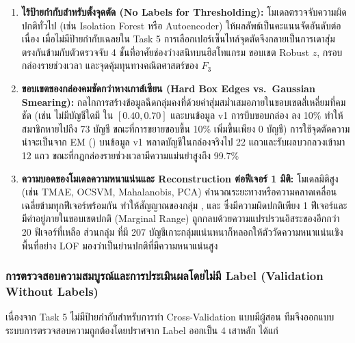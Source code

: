 \begin{decisionbox}
\begin{enumerate}
  \item \textbf{ไร้ป้ายกำกับสำหรับตั้งจุดตัด (No Labels for Thresholding):} โมเดลตรวจจับความผิดปกติทั่วไป (เช่น Isolation Forest หรือ Autoencoder) ให้ผลลัพธ์เป็นคะแนนจัดอันดับต่อเนื่อง เมื่อไม่มีป้ายกำกับเฉลยใน Task 5 การเลือกเปอร์เซ็นไทล์จุดตัดจึงกลายเป็นการเดาสุ่ม ตรงกันข้ามกับตัวตรวจจับ 4 ชั้นที่อาศัยช่องว่างสนิทบนฮิสโทแกรม ขอบเขต Robust $z$, กรอบกล่องรายช่วงเวลา และจุดคุ้มทุนทางคณิตศาสตร์ของ $F_3$
  \item \textbf{ขอบเขตของกล่องคมชัดกว่าหางเกาส์เซียน (Hard Box Edges vs.\ Gaussian Smearing):} กลไกการสร้างข้อมูลฉีดกลุ่มคงที่ด้วยค่าสุ่มสม่ำเสมอภายในขอบเขตสี่เหลี่ยมที่คมชัด (เช่น ไม่มีบัญชีใดมี  ใน $[0.40, 0.70]$ และบนข้อมูล v1 การบีบขอบกล่อง  ลง 10\% ทำให้สมาชิกหายไปถึง 73 บัญชี ขณะที่การขยายขอบขึ้น 10\% เพิ่มขึ้นเพียง 0 บัญชี) การใช้จุดตัดความน่าจะเป็นจาก EM () บนข้อมูล v1 พลาดบัญชีในกล่องจริงไป 22 แถวและรับผลบวกลวงเข้ามา 12 แถว ขณะที่กฎกล่องรายช่วงเวลามีความแม่นยำสูงถึง 99.7\%
  \item \textbf{ความบอดของโมเดลความหนาแน่นและ Reconstruction ต่อฟีเจอร์ 1 มิติ:} โมเดลมิติสูง (เช่น TMAE, OCSVM, Mahalanobis, PCA) คำนวณระยะทางหรือความคลาดเคลื่อนเฉลี่ยข้ามทุกฟีเจอร์พร้อมกัน ทำให้สัญญาณของกลุ่ม ,  และ  ซึ่งมีความผิดปกติเพียง 1 ฟีเจอร์และมีค่าอยู่ภายในขอบเขตปกติ (Marginal Range) ถูกกลบด้วยความแปรปรวนอิสระของอีกกว่า 20 ฟีเจอร์ที่เหลือ ส่วนกลุ่ม  ที่มี 207 บัญชีเกาะกลุ่มแน่นหนาก็หลอกให้ตัววัดความหนาแน่นเชิงพื้นที่อย่าง LOF มองว่าเป็นย่านปกติที่มีความหนาแน่นสูง
\end{enumerate}
\end{decisionbox}

\subsubsection{การตรวจสอบความสมบูรณ์และการประเมินผลโดยไม่มี Label (Validation Without Labels)}
\label{subsubsec:t5_validation}

เนื่องจาก Task 5 ไม่มีป้ายกำกับสำหรับการทำ Cross-Validation แบบมีผู้สอน ทีมจึงออกแบบระบบการตรวจสอบความถูกต้องโดยปราศจาก Label ออกเป็น 4 เสาหลัก ได้แก่


